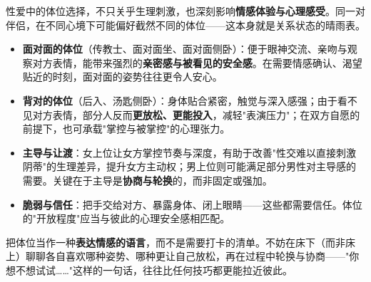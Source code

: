 性爱中的体位选择，不只关乎生理刺激，也深刻影响\textbf{情感体验与心理感受}。同一对伴侣，在不同心境下可能偏好截然不同的体位——这本身就是关系状态的晴雨表。

\begin{itemize}
	\item \textbf{面对面的体位}（传教士、面对面坐、面对面侧卧）：便于眼神交流、亲吻与观察对方表情，能带来强烈的\textbf{亲密感与被看见的安全感}。在需要情感确认、渴望贴近的时刻，面对面的姿势往往更令人安心。
	\item \textbf{背对的体位}（后入、汤匙侧卧）：身体贴合紧密，触觉与深入感强；由于看不见对方表情，部分人反而\textbf{更放松、更能投入}，减轻"表演压力"；在双方自愿的前提下，也可承载"掌控与被掌控"的心理张力。
	\item \textbf{主导与让渡}：女上位让女方掌控节奏与深度，有助于改善"性交难以直接刺激阴蒂"的生理差异，提升女方主动权；男上位则可能满足部分男性对主导感的需要。关键在于主导是\textbf{协商与轮换}的，而非固定或强加。
	\item \textbf{脆弱与信任}：把手交给对方、暴露身体、闭上眼睛——这些都需要信任。体位的"开放程度"应当与彼此的心理安全感相匹配。
\end{itemize}

\begin{tcolorbox}[colback=pink!5!white,colframe=red!50!black,title=贴心小叮咛]
把体位当作一种\textbf{表达情感的语言}，而不是需要打卡的清单。不妨在床下（而非床上）聊聊各自喜欢哪种姿势、哪种更让自己放松，再在过程中轮换与协商——"你想不想试试……"这样的一句话，往往比任何技巧都更能拉近彼此。
\end{tcolorbox}
